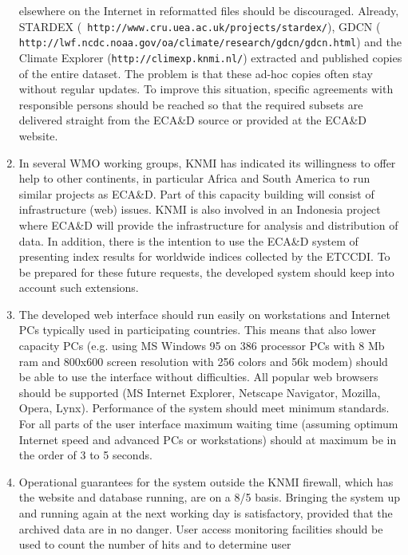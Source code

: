 \documentclass[a4paper,11pt]{article}
\begin{document}
\begin{enumerate}
      elsewhere on the Internet in reformatted files should be
      discouraged. Already, STARDEX ({\tt
      http://www.cru.uea.ac.uk/projects/stardex/}), GDCN ({\tt
      http://lwf.ncdc.noaa.gov/oa/climate/research/gdcn/gdcn.html})
      and the Climate Explorer ({\tt http://climexp.knmi.nl/})
      extracted and published copies of the entire dataset. The
      problem is that these ad-hoc copies often stay without regular
      updates. To improve this situation, specific agreements with
      responsible persons should be reached so that the required
      subsets are delivered straight from the ECA\&D source or
      provided at the ECA\&D website.
\item In several WMO working groups, KNMI has indicated its
      willingness to offer help to other continents, in particular
      Africa and South America to run similar projects as ECA\&D. Part
      of this capacity building will consist of infrastructure (web)
      issues. KNMI is also involved in an Indonesia project where
      ECA\&D will provide the infrastructure for analysis and
      distribution of data. In addition, there is the intention to use
      the ECA\&D system of presenting index results for worldwide
      indices collected by the ETCCDI. To be prepared for these future
      requests, the developed system should keep into account such
      extensions.
\item The developed web interface should run easily on workstations
      and Internet PCs typically used in participating countries. This
      means that also lower capacity PCs (e.g. using MS Windows 95 on
      386 processor PCs with 8 Mb ram and 800x600 screen resolution
      with 256 colors and 56k modem) should be able to use the
      interface without difficulties. All popular web browsers should
      be supported (MS Internet Explorer, Netscape Navigator, Mozilla,
      Opera, Lynx). Performance of the system should meet minimum
      standards. For all parts of the user interface maximum waiting
      time (assuming optimum Internet speed and advanced PCs or
      workstations) should at maximum be in the order of 3 to 5
      seconds.
\item Operational guarantees for the system outside the KNMI firewall, which 
      has the website and database running, are on a 8/5 basis. 
      Bringing the system up and running again at the next
      working day is satisfactory, provided that 
      the archived data are in no danger.  User access monitoring facilities
      should be used to count the number of hits and to determine user

\end{enumerate}
\end{document}
